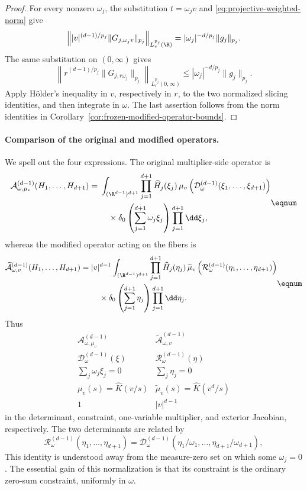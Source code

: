 \begin{proof}
For every nonzero \(\omega_j\), the substitution \(t=\omega_jv\) and
\eqref{eq:projective-weighted-norm} give
\[
  \left\||v|^{(d-1)/p_j}
  \|G_{j,\omega_jv}\|_{p_j}\right\|_{L^{p_j}_v(\R)}
  =|\omega_j|^{-d/p_j}\|g_j\|_{p_j}.
\]
The same substitution on \((0,\infty)\) gives
\[
  \left\|r^{(d-1)/p_j}
  \|G_{j,r\omega_j}\|_{p_j}\right\|_{L^{p_j}_r(0,\infty)}
  \le |\omega_j|^{-d/p_j}\|g_j\|_{p_j}.
\]
Apply H\"older's inequality in \(v\), respectively in \(r\), to the two
normalized slicing identities, and then integrate in \(\omega\).  The
last assertion follows from the norm identities in
Corollary~\ref{cor:frozen-modified-operator-bounds}.
\end{proof}

\paragraph{Comparison of the original and modified operators.}
We spell out the four expressions.  The original multiplier-side operator is
\[
\begin{aligned}
  \mathcal A_{\omega,\mu_v}^{(d-1)}
  (H_1,\ldots,H_{d+1})
  ={}&\int_{(\R^{d-1})^{d+1}}
  \prod_{j=1}^{d+1}\widehat H_j(\xi_j)\,
  \mu_v\left(
    \mathcal D_\omega^{(d-1)}
    (\xi_1,\ldots,\xi_{d+1})
  \right)\\
  &\quad\times
  \delta_0\left(\sum_{j=1}^{d+1}\omega_j\xi_j\right)
  \prod_{j=1}^{d+1}\dd\xi_j,
\end{aligned}
\eqnum \label{eq:original-affine-multiplier-form}
\]
whereas the modified operator acting on the fibers is
\[
\begin{aligned}
  \widetilde{\mathcal A}_{\omega,v}^{(d-1)}
  (H_1,\ldots,H_{d+1})
  ={}&|v|^{d-1}
  \int_{(\R^{d-1})^{d+1}}
  \prod_{j=1}^{d+1}\widehat H_j(\eta_j)\,
  \widetilde\mu_v\left(
    \mathcal R_\omega^{(d-1)}
    (\eta_1,\ldots,\eta_{d+1})
  \right)\\
  &\quad\times
  \delta_0\left(\sum_{j=1}^{d+1}\eta_j\right)
  \prod_{j=1}^{d+1}\dd\eta_j.
\end{aligned}
\eqnum \label{eq:modified-affine-multiplier-form}
\]
Thus
\[
\begin{array}{c|c}
  \mathcal A_{\omega,\mu_v}^{(d-1)}
  &\widetilde{\mathcal A}_{\omega,v}^{(d-1)}\\ \hline
  \mathcal D_\omega^{(d-1)}(\xi)
  &\mathcal R_\omega^{(d-1)}(\eta)\\
  \sum_j\omega_j\xi_j=0
  &\sum_j\eta_j=0\\
  \mu_v(s)=\widehat K(v/s)
  &\widetilde\mu_v(s)=\widehat K(v^d/s)\\
  1&|v|^{d-1}
\end{array}
\]
in the determinant, constraint, one-variable multiplier, and exterior
Jacobian, respectively.  The two determinants are related by
\[
  \mathcal R_\omega^{(d-1)}(\eta_1,\ldots,\eta_{d+1})
  =\mathcal D_\omega^{(d-1)}
  (\eta_1/\omega_1,\ldots,\eta_{d+1}/\omega_{d+1}),
\]
This identity is understood away from the measure-zero set on which some
\(\omega_j=0\).  The essential gain of this normalization is that its
constraint is the ordinary zero-sum constraint, uniformly in \(\omega\).

